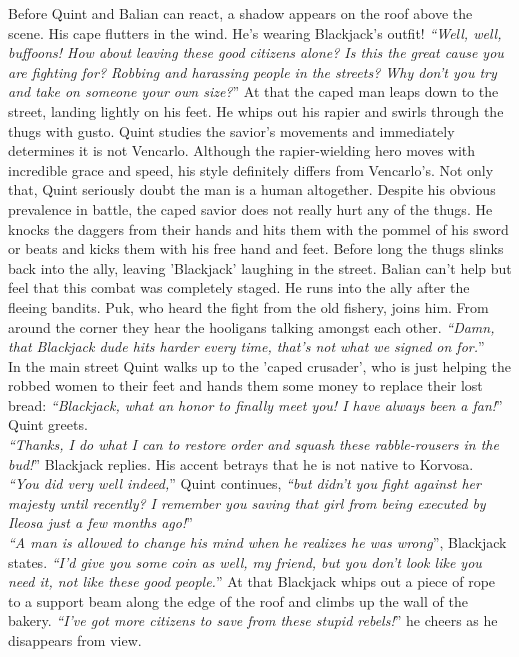 Before Quint and Balian can react, a shadow appears on the roof above the scene. His cape flutters in the wind. He's wearing Blackjack's outfit! {\itshape``Well, well, buffoons! How about leaving these good citizens alone? Is this the great cause you are fighting for? Robbing and harassing people in the streets? Why don't you try and take on someone your own size?}'' At that the caped man leaps down to the street, landing lightly on his feet. He whips out his rapier and swirls through the thugs with gusto. Quint studies the savior's movements and immediately determines it is not Vencarlo. Although the rapier-wielding hero moves with incredible grace and speed, his style definitely differs from Vencarlo's. Not only that, Quint seriously doubt the man is a human altogether. Despite his obvious prevalence in battle, the caped savior does not really hurt any of the thugs. He knocks the daggers from their hands and hits them with the pommel of his sword or beats and kicks them with his free hand and feet. Before long the thugs slinks back into the ally, leaving 'Blackjack' laughing in the street. Balian can't help but feel that this combat was completely staged. He runs into the ally after the fleeing bandits. Puk, who heard the fight from the old fishery, joins him. From around the corner they hear the hooligans talking amongst each other. {\itshape``Damn, that Blackjack dude hits harder every time, that's not what we signed on for.}''\\

In the main street Quint walks up to the 'caped crusader', who is just helping the robbed women to their feet and hands them some money to replace their lost bread: {\itshape``Blackjack, what an honor to finally meet you! I have always been a fan!}'' Quint greets.\\

{\itshape``Thanks, I do what I can to restore order and squash these rabble-rousers in the bud!}'' Blackjack replies. His accent betrays that he is not native to Korvosa.\\

{\itshape``You did very well indeed,}'' Quint continues, {\itshape``but didn't you fight against her majesty until recently? I remember you saving that girl from being executed by Ileosa just a few months ago!}''\\

{\itshape``A man is allowed to change his mind when he realizes he was wrong}'', Blackjack states. {\itshape``I'd give you some coin as well, my friend, but you don't look like you need it, not like these good people.}'' At that Blackjack whips out a piece of rope to a support beam along the edge of the roof and climbs up the wall of the bakery. {\itshape``I've got more citizens to save from these stupid rebels!}'' he cheers as he disappears from view.\\

